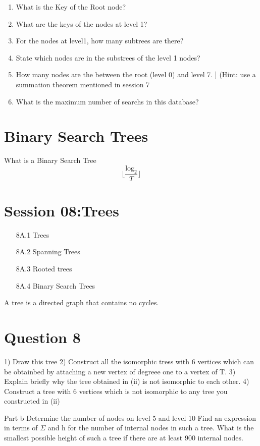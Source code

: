 \begin{enumerate}
\item What is the Key of the Root node?
\item What are the keys of the nodes at level 1?
\item For the nodes at level1, how many subtrees are there?
\item State which nodes are in the substrees of the level 1 nodes?
\item How many nodes are the between the root (level 0) and level 7. ]
(Hint: use a summation theorem mentioned in session 7
\item What is the maximum number of searchs in this database?
\end{enumerate}

\section*{Binary Search Trees}
What is a Binary Search Tree
\[ \lfloor  \frac{\mbox{log}_2}{T} \rfloor \]

\section*{Session 08:Trees}
\begin{itemize}
\item[8A.1] Trees
\item[8A.2] Spanning Trees
\item[8A.3] Rooted trees
\item[8A.4] Binary Search Trees
\end{itemize}
A tree is a directed graph that contains no cycles.
\section{Question 8}

1) Draw this tree
2) Construct all the isomorphic tress with 6 vertices which can be obtainbed by attaching a new vertex of degreee one to a vertex of T.
3) Explain briefly why the tree obtained in (ii) is not isomorphic to each other.
4) Construct a tree with 6 vertices which is not isomorphic to any tree you constructed in (ii)

Part b
Determine the number of nodes on level 5 and level 10
Find an expression in terms of $\Sigma$ and h for the number of internal nodes in such a tree.
What is the smallest possible height of such a tree if there are at least 900 internal nodes.

